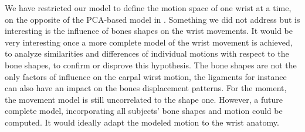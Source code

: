We have restricted our model to define the motion space of one wrist at a time, on the opposite of the PCA-based model in \cite{chen_2012_automatic}. 
Something we did not address but is interesting is the influence of bones shapes on the wrist movements. %
It would be very interesting once a more complete model of the wrist movement is achieved, to analyze similarities and differences of individual motions with respect to the bone shapes, to confirm or disprove this hypothesis. The bone shapes are not the only factors of influence on the carpal wirst motion, the ligaments for instance can also have an impact on the bones displacement patterns. For the moment, the movement model is still uncorrelated to the shape one. However, a future complete model, incorporating all subjects' bone shapes and motion could be computed. It would ideally adapt the modeled motion to the wrist anatomy. 
